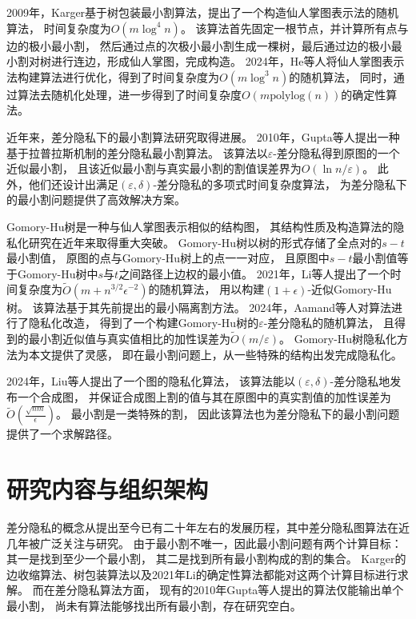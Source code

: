 2009年，Karger基于树包装最小割算法，提出了一个构造仙人掌图表示法的随机算法，
时间复杂度为$O(m\log^4n)$。\cite{karger2009near}
该算法首先固定一根节点，并计算所有点与边的极小最小割，
然后通过点的次极小最小割生成一棵树，最后通过边的极小最小割对树进行连边，形成仙人掌图，完成构造。
2024年，He等人将仙人掌图表示法构建算法进行优化，得到了时间复杂度为$O(m\log^3n)$的随机算法，
同时，通过算法去随机化处理，进一步得到了时间复杂度$O(m\text{polylog}(n))$的确定性算法。\cite{he2024cactus}

近年来，差分隐私下的最小割算法研究取得进展。
2010年，Gupta等人提出一种基于拉普拉斯机制的差分隐私最小割算法。\cite{gupta2010differentially}
该算法以$\varepsilon$-差分隐私得到原图的一个近似最小割，
且该近似最小割与真实最小割的割值误差界为$O(\ln n/\varepsilon)$。
此外，他们还设计出满足$(\varepsilon,\delta)$-差分隐私的多项式时间复杂度算法，
为差分隐私下的最小割问题提供了高效解决方案。

Gomory-Hu树是一种与仙人掌图表示相似的结构图，
其结构性质及构造算法的隐私化研究在近年来取得重大突破。
Gomory-Hu树以树的形式存储了全点对的$s-t$最小割值，
原图的点与Gomory-Hu树上的点一一对应，
且原图中$s-t$最小割值等于Gomory-Hu树中$s$与$t$之间路径上边权的最小值。
2021年，Li等人提出了一个时间复杂度为$\tilde O(m+n^{3/2}\epsilon^{-2})$的随机算法，
用以构建$(1+\epsilon)$-近似Gomory-Hu树。\cite{li2021approximate}
该算法基于其先前提出的最小隔离割方法。\cite{li2020deterministic}
2024年，Aamand等人对算法进行了隐私化改造，
得到了一个构建Gomory-Hu树的$\varepsilon$-差分隐私的随机算法，
且得到的最小割近似值与真实值相比的加性误差为$\tilde O(m/\varepsilon)$。\cite{li2021approximate}
Gomory-Hu树隐私化方法为本文提供了灵感，
即在最小割问题上，从一些特殊的结构出发完成隐私化。

2024年，Liu等人提出了一个图的隐私化算法，
该算法能以$(\varepsilon,\delta)$-差分隐私地发布一个合成图，
并保证合成图上割的值与其在原图中的真实割值的加性误差为$\tilde O(\frac{\sqrt {nm}}{\epsilon})$。\cite{liu2024optimal}
最小割是一类特殊的割，
因此该算法也为差分隐私下的最小割问题提供了一个求解路径。

\section{研究内容与组织架构}

差分隐私的概念从提出至今已有二十年左右的发展历程，其中差分隐私图算法在近几年被广泛关注与研究。
由于最小割不唯一，因此最小割问题有两个计算目标：
其一是找到至少一个最小割，
其二是找到所有最小割构成的割的集合。
Karger的边收缩算法、树包装算法以及2021年Li的确定性算法都能对这两个计算目标进行求解。
而在差分隐私算法方面，
现有的2010年Gupta等人提出的算法仅能输出单个最小割，
尚未有算法能够找出所有最小割，存在研究空白。

